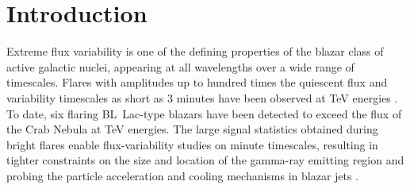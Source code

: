 \documentclass[twocolumn]{aastex6}
\begin{document}
\section{Introduction}
Extreme flux variability is one of the defining properties of the blazar class of active galactic nuclei, appearing at all wavelengths over a wide range of timescales. Flares with amplitudes up to hundred times the quiescent flux and variability timescales as short as 3 minutes have been observed at TeV energies \citep[$E\gtrsim 0.1\,\mathrm{TeV}$; see, e.g.,][]{hess_2155}. 
To date, six flaring BL~Lac-type blazars have been detected to exceed the flux of the Crab Nebula 
\citep[$1\, \mathrm{Crab}=\left(2.1 \pm 0.2\right)\times 10^{-10}$\,cm$^{-2}$\,s$^{-1}$ at $E>0.2\,\mathrm{TeV}$,][]{hillas85} at TeV energies. 
The large signal statistics obtained during bright flares enable flux-variability studies on minute timescales, resulting in tighter constraints on the size and location of the gamma-ray emitting region \citep[see, e.g.,][]{begelman} and probing the particle acceleration and cooling mechanisms in blazar jets \citep[see, e.g.,][]{bykov}.
\end{document}
